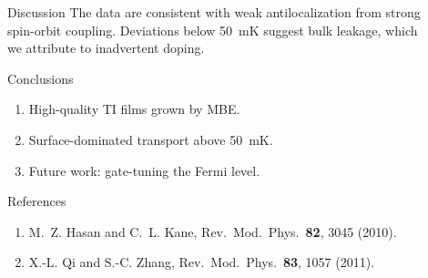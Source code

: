 \documentclass[final]{beamer}
\newlength{\sepwidth}
\newlength{\colwidth}
\newcommand{\separatorcolumn}{\begin{column}{\sepwidth}\end{column}}
\begin{document}
\begin{frame}[t]
\begin{columns}[t]
\separatorcolumn
\begin{column}{\colwidth}

  \begin{block}{Discussion}
    The data are consistent with weak antilocalization from strong
    spin-orbit coupling. Deviations below \SI{50}{\milli\kelvin} suggest
    bulk leakage, which we attribute to inadvertent doping.
  \end{block}

  \begin{block}{Conclusions}
    \begin{enumerate}
      \item High-quality TI films grown by MBE.
      \item Surface-dominated transport above \SI{50}{\milli\kelvin}.
      \item Future work: gate-tuning the Fermi level.
    \end{enumerate}
  \end{block}

  \begin{block}{References}
    \small
    \begin{enumerate}
      \item M.~Z. Hasan and C.~L. Kane, Rev.\ Mod.\ Phys.\ \textbf{82}, 3045 (2010).
      \item X.-L. Qi and S.-C. Zhang, Rev.\ Mod.\ Phys.\ \textbf{83}, 1057 (2011).
    \end{enumerate}
  \end{block}

\end{column}
\separatorcolumn

\end{columns}
\end{frame}
\end{document}
